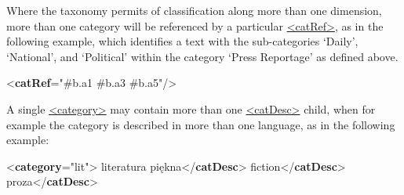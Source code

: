 Where the taxonomy permits of classification along more than one dimension, more than one category will be referenced by a particular \hyperref[TEI.catRef]{<catRef>}, as in the following example, which identifies a text with the sub-categories ‘Daily’, ‘National’, and ‘Political’ within the category ‘Press Reportage’ as defined above. \par\bgroup{}\exampleFont \begin{shaded}\noindent\mbox{}{<\textbf{catRef}\hspace*{1em}{target}="{\#b.a1 \#b.a3 \#b.a5}"/>}\end{shaded}\egroup\par \par
A single \hyperref[TEI.category]{<category>} may contain more than one \hyperref[TEI.catDesc]{<catDesc>} child, when for example the category is described in more than one language, as in the following example: \par\bgroup{}\exampleFont \begin{shaded}\noindent\mbox{}{<\textbf{category}\hspace*{1em}{xml:id}="{lit}">}\mbox{}\newline 
{}literatura piękna{</\textbf{catDesc}>}\mbox{}\newline 
{}fiction{</\textbf{catDesc}>}\mbox{}\newline 
{}\mbox{}\newline 
\hspace*{1em}proza{</\textbf{catDesc}>}\mbox{}\newline 

\end{shaded}
